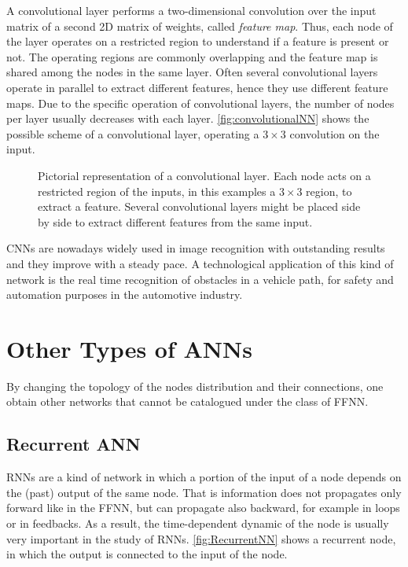 A convolutional layer performs a two-dimensional convolution over the input matrix of a second 2D matrix of weights, called \textit{feature map}.
Thus, each node of the layer operates on a restricted region to understand if a feature is present or not.
The operating regions are commonly overlapping and the feature map is shared among the nodes in the same layer.
Often several convolutional layers operate in parallel to extract different features, hence they use different feature maps.
Due to the specific operation of convolutional layers, the number of nodes per layer usually decreases with each layer.
\autoref{fig:convolutionalNN} shows the possible scheme of a convolutional layer, operating a $3\times 3$ convolution on the input.

\begin{figure}[ht]
	\centering
	
	\caption{%
		Pictorial representation of a convolutional layer.
		Each node acts on a restricted region of the inputs, in this examples a $3\times 3$ region, to extract a feature.
		Several convolutional layers might be placed side by side to extract different features from the same input.
		}
	\label{fig:convolutionalNN}
\end{figure}

\acsp{CNN} are nowadays widely used in image recognition with outstanding results and they improve with a steady pace.
A technological application of this kind of network is the real time recognition of obstacles in a vehicle path, for safety and automation purposes in the automotive industry.

\section{Other Types of \acsp{ANN}}
\label{sec:Other_Types_of_NNs}
By changing the topology of the nodes distribution and their connections, one obtain other networks that cannot be catalogued under the class of \acs{FFNN}.

\subsection{Recurrent ANN}
\label{ssec:Recurrent_ANN}
\acp{RNN} are a kind of network in which a portion of the input of a node depends on the (past) output of the same node.%
That is information does not propagates only forward like in the \acs{FFNN}, but can propagate also backward, for example in loops or in feedbacks.
As a result, the time-dependent dynamic of the node is usually very important in the study of \acsp{RNN}.
\autoref{fig:RecurrentNN} shows a recurrent node, in which the output is connected to the input of the node.

